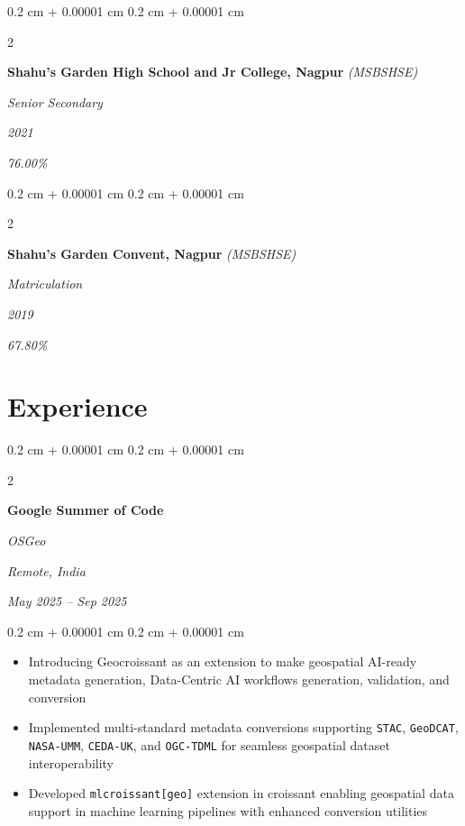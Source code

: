 \documentclass[10pt, letterpaper]{article}
\newenvironment{highlights}{
    \begin{itemize}[
        topsep=0.10 cm,
        parsep=0.10 cm,
        partopsep=0pt,
        itemsep=0pt,
        leftmargin=0.4 cm + 10pt
    ]
}{
    \end{itemize}
} %
\newenvironment{onecolentry}{
    \begin{adjustwidth}{
        0.2 cm + 0.00001 cm
    }{
        0.2 cm + 0.00001 cm
    }
}{
    \end{adjustwidth}
} %
\newenvironment{twocolentry}[2][]{
    \onecolentry
    \def\secondColumn{#2}
    \setcolumnwidth{\fill, 4.5 cm}
    \begin{paracol}{2}
}{
    \switchcolumn \raggedleft \secondColumn
    \end{paracol}
    \endonecolentry
} %
\begin{document}
        \vspace{0.2 cm}

        \begin{twocolentry}{
        \textit{2021}
        
        \textit{76.00\%}}
            \textbf{Shahu's Garden High School and Jr College, Nagpur} {\small\textit{(MSBSHSE)}}
            
            \textit{Senior Secondary}
        \end{twocolentry}

        \vspace{0.2 cm}

        \begin{twocolentry}{
        \textit{2019}
        
        \textit{67.80\%}}
            \textbf{Shahu's Garden Convent, Nagpur} {\small\textit{(MSBSHSE)}}

            \textit{Matriculation}
        \end{twocolentry}



    
    \section{Experience}



        \begin{twocolentry}{
        \textit{Remote, India}
        
        \textit{May 2025 – Sep 2025}}
            \textbf{Google Summer of Code}
            
            \textit{OSGeo}
        \end{twocolentry}

        \vspace{0.10 cm}
        \begin{onecolentry}
            \begin{highlights}
                \item Introducing Geocroissant as an extension to make geospatial AI-ready metadata generation, Data-Centric AI workflows generation, validation, and conversion
                \item Implemented multi-standard metadata conversions supporting \texttt{STAC}, \texttt{GeoDCAT}, \texttt{NASA-UMM}, \texttt{CEDA-UK}, and \texttt{OGC-TDML} for seamless geospatial dataset interoperability
                \item Developed \texttt{mlcroissant[geo]} extension in croissant enabling geospatial data support in machine learning pipelines with enhanced conversion utilities
            \end{highlights}
        \end{onecolentry}
\end{document}
